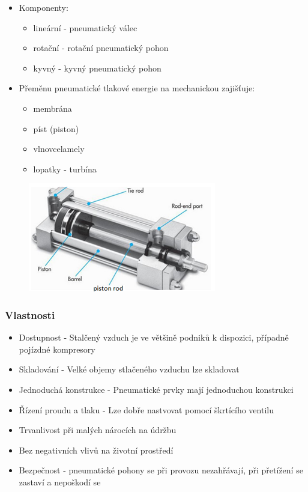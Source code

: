 \begin{itemize}
  \item Komponenty: \begin{itemize}
    \item lineární - pneumatický válec
    \item rotační - rotační pneumatický pohon
    \item kyvný - kyvný pneumatický pohon
  \end{itemize}
  \item Přeměnu pneumatické tlakové energie na mechanickou zajišťuje: \begin{itemize}
    \item membrána
    \item píst (piston)
    \item vlnovcelamely
    \item lopatky - turbína
  \end{itemize}
\end{itemize}

\begin{figure}[h]
  \begin{center}
    \includegraphics[scale = 1]{img/Picture10.png}
  \end{center}
\end{figure}

\subsubsection*{Vlastnosti}
\begin{itemize}
  \item Dostupnost - Stalčený vzduch je ve většině podniků k dispozici, případně pojízdné kompresory
  \item Skladování - Velké objemy stlačeného vzduchu lze skladovat
  \item Jednoduchá konstrukce - Pneumatické prvky mají jednoduchou konstrukci
  \item Řízení proudu a tlaku - Lze dobře nastvovat pomocí škrtícího ventilu
  \item Trvanlivost při malých nárocích na údržbu
  \item Bez negativních vlivů na životní prostředí
  \item Bezpečnost - pneumatické pohony se při provozu nezahřávají, při přetížení se zastaví a nepoškodí se
  \end{itemize}

